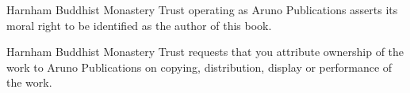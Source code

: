 {Harnham Buddhist Monastery Trust operating as Aruno Publications asserts its moral right to be identified as the author of this book.

Harnham Buddhist Monastery Trust requests that you attribute ownership of the work to Aruno Publications on copying, distribution, display or performance of the work.

}
